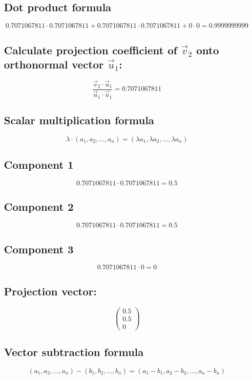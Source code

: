\documentclass{article}
\begin{document}
\subsection*{ \vspace{1em} Dot product formula}
\[
0.7071067811 \cdot 0.7071067811 + 0.7071067811 \cdot 0.7071067811 + 0 \cdot 0 = 0.9999999999
\]
\subsection*{ \vspace{1em} Calculate projection coefficient of \(\vec{v}_{2}\) onto orthonormal vector \(\vec{u}_{1}\):}
\[
\frac{\vec{v}_{2} \cdot \vec{u}_{1}}{\vec{u}_{1} \cdot \vec{u}_{1}} = 0.7071067811
\]
\subsection*{ \vspace{1em} Scalar multiplication formula}
\[
\lambda \cdot (a_1, a_2, \dots, a_n) = (\lambda a_1, \lambda a_2, \dots, \lambda a_n)
\]
\subsection*{ \vspace{1em} Component 1}
\[
0.7071067811 \cdot 0.7071067811 = 0.5
\]
\subsection*{ \vspace{1em} Component 2}
\[
0.7071067811 \cdot 0.7071067811 = 0.5
\]
\subsection*{ \vspace{1em} Component 3}
\[
0.7071067811 \cdot 0 = 0
\]
\subsection*{ \vspace{1em} Projection vector:}
\[
\begin{pmatrix}0.5 \\ 0.5 \\ 0\end{pmatrix}
\]
\subsection*{ \vspace{1em} Vector subtraction formula}
\[
(a_1, a_2, \dots, a_n) - (b_1, b_2, \dots, b_n) = (a_1 - b_1, a_2 - b_2, \dots, a_n - b_n)
\]
\end{document}
